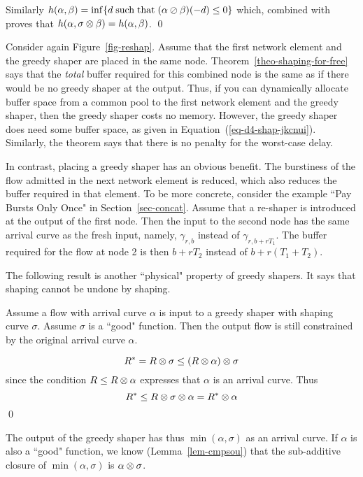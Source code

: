 Similarly $h(\alpha, \beta)= \inf\{ d \mathrm{\; such \; that \; } (\alpha \oslash \beta)(-d)
\leq 0 \}$ which, combined with  proves that
$h(\alpha, \sigma \otimes \beta)=h(\alpha, \beta)$.
\qed

Consider again Figure~\ref{fig-reshap}. Assume that the first
network element and the greedy shaper are placed in the same node.
Theorem~\ref{theo-shaping-for-free} says that the \emph{total}
buffer required for this combined node is the same as if there
would be no greedy shaper at the output. Thus, if you can
dynamically allocate buffer space from a common pool to the first
network element and the greedy shaper, then the greedy shaper
costs no memory. However, the greedy shaper does need some buffer
space, as given in Equation~(\ref{eq-d4-shap-jkcnui}). Similarly,
the theorem says that there is no penalty for the worst-case
delay.

In contrast, placing a greedy shaper has an obvious benefit. The
burstiness of the flow admitted in the next network element is
reduced, which also reduces the buffer required in that element.
To be more concrete, consider the example ``Pay Bursts Only Once"
in Section~\ref{sec-concat}. Assume that a re-shaper is introduced
at the output of the first node. Then the input to the second node
has the same arrival curve as the fresh input, namely,
$\gamma_{r,b}$ instead of $\gamma_{r,b+r T_1}$. The buffer
required for the flow at node 2 is then $b+rT_2$ instead of
$b+r(T_1+T_2)$.

The following result is another ``physical" property of greedy
shapers. It says that shaping cannot be undone by shaping.

\begin{theorem}
    Assume a flow with arrival curve $\alpha$ is input to a greedy shaper with
    shaping curve $\sigma$. Assume $\sigma$ is a ``good" function. Then the
    output flow is still constrained by the original arrival curve $\alpha$.
\end{theorem}

\pr
$$ R^{*}=R \otimes \sigma \leq (R \otimes \alpha) \otimes \sigma
$$ since the condition $R \leq R \otimes \alpha$ expresses that
$\alpha$ is an arrival curve. Thus $$ R^{*} \leq R \otimes \sigma
\otimes \alpha = R^{*} \otimes \alpha $$ \qed

The output of the greedy shaper has thus $\min(\alpha, \sigma)$ as
an arrival curve. If $\alpha$ is also a ``good" function, we know
(Lemma~\ref{lem-cmpsou}) that the sub-additive closure of
$\min(\alpha, \sigma)$ is $\alpha \otimes \sigma$.

